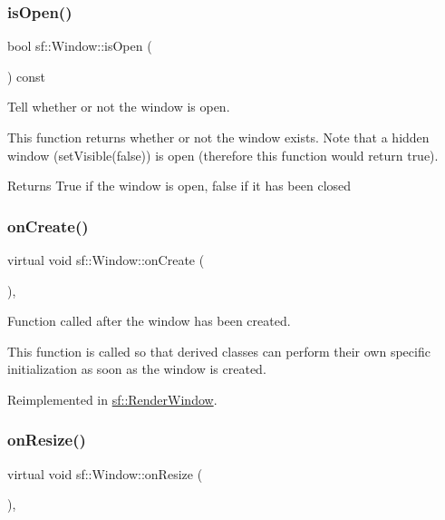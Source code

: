 \subsubsection{\texorpdfstring{is\+Open()}{isOpen()}}
{\footnotesize\ttfamily bool sf\+::\+Window\+::is\+Open (\begin{DoxyParamCaption}{ }\end{DoxyParamCaption}) const}



Tell whether or not the window is open. 

This function returns whether or not the window exists. Note that a hidden window (set\+Visible(false)) is open (therefore this function would return true).

\begin{DoxyReturn}{Returns}
True if the window is open, false if it has been closed 
\end{DoxyReturn}
\mbox{\label{classsf_1_1_window_a106633b9be49b27f83d4712689b493eb}} 
\subsubsection{\texorpdfstring{on\+Create()}{onCreate()}}
{\footnotesize\ttfamily virtual void sf\+::\+Window\+::on\+Create (\begin{DoxyParamCaption}{ }\end{DoxyParamCaption})\hspace{0.3cm}{\ttfamily [protected]}, {\ttfamily [virtual]}}



Function called after the window has been created. 

This function is called so that derived classes can perform their own specific initialization as soon as the window is created. 

Reimplemented in \hyperlink{classsf_1_1_render_window_a5bef0040b0fa87bed9fbd459c980d53a}{sf\+::\+Render\+Window}.

\mbox{\label{classsf_1_1_window_a10f567a387da7b49f417f73321fcf64d}} 
\subsubsection{\texorpdfstring{on\+Resize()}{onResize()}}
{\footnotesize\ttfamily virtual void sf\+::\+Window\+::on\+Resize (\begin{DoxyParamCaption}{ }\end{DoxyParamCaption})\hspace{0.3cm}{\ttfamily [protected]}, {\ttfamily [virtual]}}



